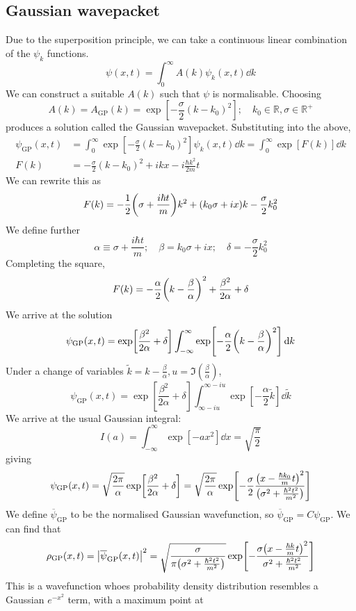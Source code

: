 \subsection{Gaussian wavepacket}
Due to the superposition principle, we can take a continuous linear combination of the \( \psi_k \) functions.
\[
	\psi(x,t) = \int_0^\infty A(k) \psi_k(x,t) \dd{k}
\]
We can construct a suitable \( A(k) \) such that \( \psi \) is normalisable.
Choosing
\[
	A(k) = A_{\text{GP}}(k) = \exp[-\frac{\sigma}{2}(k-k_0)^2];\quad k_0 \in \mathbb R, \sigma \in \mathbb R^+
\]
produces a solution called the Gaussian wavepacket.
Substituting into the above,
\begin{align*}
	\psi_{\text{GP}}(x,t) &= \int_0^\infty \exp[-\frac{\sigma}{2}(k-k_0)^2] \psi_k(x,t) \dd{k} = \int_0^\infty \exp[F(k)] \dd{k} \\
	F(k) &= -\frac{\sigma}{2}(k-k_0)^2 + ikx - i \frac{\hbar k^2}{2m} t
\end{align*}
We can rewrite this as
\[
	F(k) = -\frac{1}{2}\qty(\sigma + \frac{i \hbar t}{m}) k^2 + (k_0 \sigma + ix)k - \frac{\sigma}{2} k_0^2
\]
We define further
\[
	\alpha \equiv \sigma + \frac{i \hbar t}{m};\quad \beta = k_0 \sigma + ix;\quad \delta = -\frac{\sigma}{2} k_0^2
\]
Completing the square,
\[
	F(k) = -\frac{\alpha}{2} \qty(k - \frac{\beta}{\alpha})^2 + \frac{\beta^2}{2\alpha} + \delta
\]
We arrive at the solution
\[
	\psi_{\text{GP}}(x,t) = \exp[\frac{\beta^2}{2\alpha} + \delta] \int_{-\infty}^\infty \exp[-\frac{\alpha}{2}\qty(k - \frac{\beta}{\alpha})^2 ] \dd{k}
\]
Under a change of variables \( \widetilde k = k - \frac{\beta}{\alpha}, u = \Im(\frac{\beta}{\alpha}) \),
\[
	\psi_{\text{GP}}(x,t) = \exp[\frac{\beta^2}{2\alpha} + \delta] \int_{\infty - iu}^{\infty - iu} \exp[-\frac{\alpha}{2} \widetilde k] \dd{\widetilde k}
\]
We arrive at the usual Gaussian integral:
\[
	I(a) = \int_{-\infty}^\infty \exp[-a x^2] \dd{x} = \sqrt{\frac{\pi}{2}}
\]
giving
\[
	\psi_{\text{GP}}(x,t) = \sqrt{\frac{2 \pi}{\alpha}} \exp[\frac{\beta^2}{2\alpha} + \delta] = \sqrt{\frac{2\pi}{\alpha}} \exp[-\frac{\sigma}{2} \frac{\qty(x - \frac{\hbar k_0}{m} t)^2}{\qty(\sigma^2 + \frac{\hbar^2 t^2}{m^2} )} ]
\]
We define \( \overline \psi_{\text{GP}} \) to be the normalised Gaussian wavefunction, so \( \overline \psi_{\text{GP}} = C \psi_{\text{GP}} \).
We can find that
\[
	\rho_{\text{GP}}(x,t) = \abs{\overline \psi_{\text{GP}}(x,t)}^2 = \sqrt{\frac{\sigma}{\pi \qty(\sigma^2 + \frac{\hbar^2 t^2}{m^2})}} \exp[ - \frac{\sigma\qty(x - \frac{\hbar k}{m} t)^2}{\sigma^2 + \frac{\hbar^2 t^2}{m^2}} ]
\]
This is a wavefunction whoes probability density distribution resembles a Gaussian \( e^{-x^2} \) term, with a maximum point at
